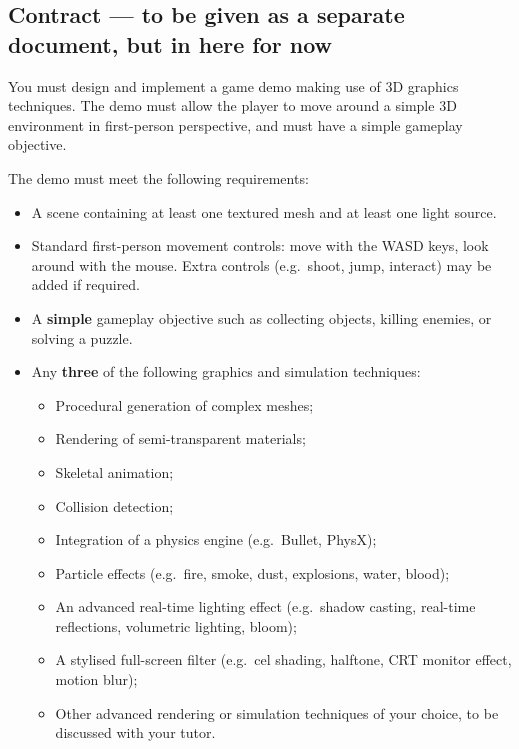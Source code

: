 \documentclass{../fal_assignment}
\begin{document}
\subsection*{Contract --- to be given as a separate document, but in here for now}

You must design and implement a game demo making use of 3D graphics techniques.
The demo must allow the player to move around a simple 3D environment in first-person perspective,
and must have a simple gameplay objective.

The demo must meet the following requirements:

\begin{itemize}
	\item A scene containing at least one textured mesh and at least one light source.
	\item Standard first-person movement controls: move with the WASD keys, look around with the mouse.
		Extra controls (e.g.\ shoot, jump, interact) may be added if required.
	\item A \textbf{simple} gameplay objective such as collecting objects, killing enemies, or solving a puzzle.
	\item Any \textbf{three} of the following graphics and simulation techniques:
		\begin{itemize}
			\item Procedural generation of complex meshes;
			\item Rendering of semi-transparent materials;
			\item Skeletal animation;
			\item Collision detection;
			\item Integration of a physics engine (e.g.\ Bullet, PhysX);
			\item Particle effects (e.g.\ fire, smoke, dust, explosions, water, blood);
			\item An advanced real-time lighting effect (e.g.\ shadow casting, real-time reflections, volumetric lighting, bloom);
			\item A stylised full-screen filter (e.g.\ cel shading, halftone, CRT monitor effect, motion blur);
			\item Other advanced rendering or simulation techniques of your choice, to be discussed with your tutor.
		\end{itemize}
\end{itemize}
\end{document}
